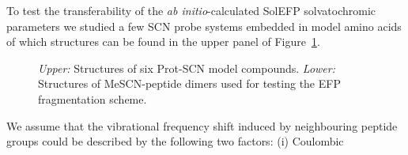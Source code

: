 \documentclass[b5paper,oneside,fleqn,11pt]{book}
\begin{document}
\begin{refsection}
To test the transferability of the \emph{ab initio}\hyp{}calculated SolEFP
solvatochromic parameters we studied a few SCN probe
systems embedded in model amino acids of which structures
can be found in the upper panel of Figure~\ref{f:mescn-prot-struct}. 
%
\begin{figure}[t!]
\centering
\setlength\fboxsep{0.4pt}
\setlength\fboxrule{0.5pt}
\caption{
\emph{Upper:} Structures of six Prot-SCN model compounds.
\emph{Lower:} Structures of MeSCN-peptide dimers used for testing the EFP fragmentation
scheme.
\label{f:mescn-prot-struct}}
\end{figure}
%
We assume that the vibrational
frequency shift induced by neighbouring peptide groups could
be described by the following two factors: (i) Coulombic

\end{refsection}
\end{document}
